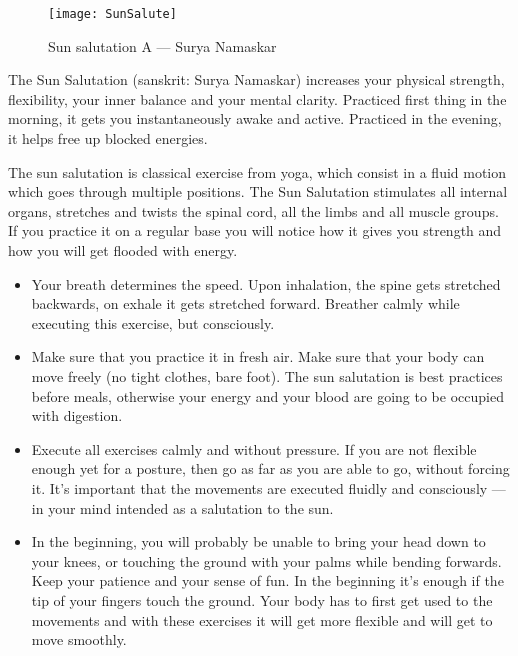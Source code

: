 \documentclass[../Book.Stress_regulation.tex]{subfiles}
\begin{document}
\label{Ex:SunSalutation}
\begin{figure}[htb!]
\texttt{[image: SunSalute]}\label{sf:yoga}
\caption{Sun salutation A --- Surya Namaskar}
\end{figure}


The Sun Salutation (sanskrit: Surya Namaskar) increases your physical strength, flexibility, your inner balance and your mental clarity.
Practiced first thing in the morning, it gets you instantaneously awake and active.
Practiced in the evening, it helps free up blocked energies.

The sun salutation is classical exercise from yoga, which consist in a fluid motion which goes through multiple positions.
The Sun Salutation stimulates all internal organs, stretches and twists the spinal cord, all the limbs and all muscle groups.
If you practice it on a regular base you will notice how it gives you strength and how you will get flooded with energy.

\begin{itemize}
\item Your breath determines the speed.
  Upon inhalation, the spine gets stretched backwards, on exhale it gets stretched forward.
  Breather calmly while executing this exercise, but consciously.
\item Make sure that you practice it in fresh air.
  Make sure that your body can move freely (no tight clothes, bare foot).
  The sun salutation is best practices before meals, otherwise your energy and your blood are going to be occupied with digestion.
\item Execute all exercises calmly and without pressure. If you are not flexible enough yet for a posture, then go as far as you are able to go, without forcing it.
  It's important that the movements are executed fluidly and consciously --- in your mind intended as a salutation to the sun.
\item In the beginning, you will probably be unable to bring your head down to your knees, or touching the ground with your palms while bending forwards.
  Keep your patience and your sense of fun. In the beginning it's enough if the tip of your fingers touch the ground.
  Your body has to first get used to the movements and with these exercises it will get more flexible and will get to move smoothly.
\end{itemize}
\newpage
\end{document}
